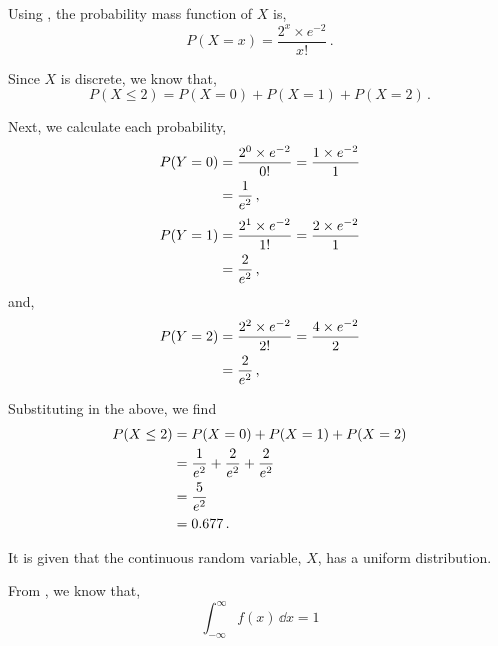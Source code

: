 \begin{subquestions}
Using , the probability mass function of $X$ is,
\begin{equation}
	P(X=x)= \frac{2^x \times e^{-2}}{x!} \,.
\end{equation}

Since $X$ is discrete, we know that,
\begin{equation}
	P(X \leq 2) = P(X=0)+P(X=1)+P(X=2) \,.
\end{equation}

Next, we calculate each probability,
\begin{align}
	P(Y=0) & = \frac{2^0 \times e^{-2}}{0!} 
             = \frac{1 \times e^{-2}}{1} \nonumber \\
	       & = \frac{1}{e^2} \,,
\end{align}
\begin{align}
	P(Y=1) & = \frac{2^1 \times e^{-2}}{1!} 
	         = \frac{2 \times e^{-2}}{1} \nonumber \\
	       & = \frac{2}{e^2} \,,  
\end{align}
and,
\begin{align}    
	P(Y=2) & = \frac{2^2 \times e^{-2}}{2!} 
	         = \frac{4 \times e^{-2}}{2} \nonumber \\
	       & = \frac{2}{e^2} \,,
\end{align}

Substituting in the above, we find
\begin{align}   
	P(X \leq 2) & = P(X=0)+P(X=1)+P(X=2) \nonumber \\
	            & = \frac{1}{e^2} + \frac{2}{e^2} + \frac{2}{e^2} \nonumber \\
	            & = \frac{5}{e^2} \nonumber \\
	            & = 0.677 \,. 
\end{align}


\subquestion

It is given that the continuous random variable, $X$, has a uniform distribution.

\begin{subsubquestions}
	
\subsubquestion

From , we know that,
\begin{equation}
	\int_{-\infty}^{\infty} f(x) \, \dd x = 1
\end{equation}


\end{subsubquestions}
\end{subquestions}
